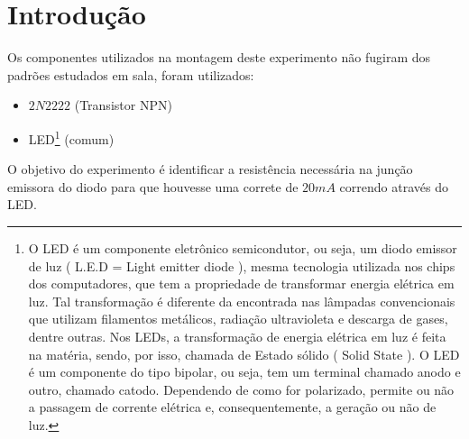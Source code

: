 \chapter*[Introdu\c{c}\~{a}o]{Introdu\c{c}\~{a}o}

	Os componentes utilizados na montagem deste experimento não fugiram dos padrões estudados em sala, foram utilizados:

\begin{itemize}
	\item $ 2N2222 $ (Transistor NPN)
	\item LED\footnote[1]{O LED é um componente eletrônico semicondutor, ou seja, um diodo emissor de luz ( L.E.D = Light emitter diode ), mesma tecnologia utilizada nos chips dos computadores, que tem a propriedade de transformar energia elétrica em luz. Tal transformação é diferente da encontrada nas lâmpadas convencionais que utilizam filamentos metálicos, radiação ultravioleta e descarga de gases, dentre outras. Nos LEDs, a transformação de energia elétrica em luz é feita na matéria, sendo, por isso, chamada de Estado sólido ( Solid State ). O LED é um componente do tipo bipolar, ou seja, tem um terminal chamado anodo e outro, chamado catodo. Dependendo de como for polarizado, permite ou não a passagem de corrente elétrica e, consequentemente, a geração ou não de luz.
	} (comum)
\end{itemize}
	
	
	O objetivo do experimento é identificar a resistência necessária na junção emissora do diodo para que houvesse uma correte de $ 20mA $ correndo através do LED. 
